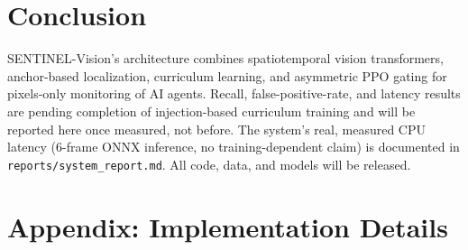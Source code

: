 \documentclass[11pt,a4paper]{article}
\begin{document}
\section{Conclusion}
SENTINEL-Vision's architecture combines spatiotemporal vision transformers, anchor-based localization, curriculum learning, and asymmetric PPO gating for pixels-only monitoring of AI agents. Recall, false-positive-rate, and latency results are pending completion of injection-based curriculum training and will be reported here once measured, not before. The system's real, measured CPU latency (6-frame ONNX inference, no training-dependent claim) is documented in \texttt{reports/system\_report.md}. All code, data, and models will be released.




\appendix

\section{Appendix: Implementation Details}
\end{document}
